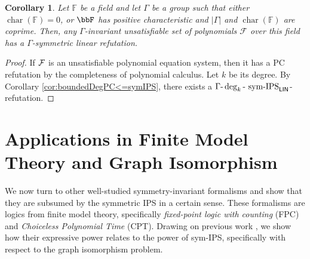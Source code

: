 \documentclass[10pt,a4paper]{article}
\newtheorem{corollary}[theorem]{Corollary}
\newcommand{\Ff}{{\cal F}}
\newcommand{\Field}{\ensuremath{\mathbb{F}}}
\newcommand{\F}{\ensuremath{\mathcal{F}}}
\newcommand{\symIPSlin}{\text{ \upshape sym-IPS}_{\mathsf{LIN}}}
\DeclareMathOperator{\charact}{char}
\begin{document}
\begin{corollary}
	\label{cor:completenessOfSymLinIPS}
	Let $\Field$ be a field and let $\Gamma$ be a group
	such that either $\charact(\Field) = 0$, or $\bbF$ has positive characteristic and $|\Gamma|$ and $\charact(\Field)$ are coprime.  Then, any $\Gamma$-invariant unsatisfiable set of polynomials $\F$ over this field has a $\Gamma$-symmetric linear refutation.
\end{corollary}	
\begin{proof}
	If $\Ff$ is an unsatisfiable polynomial equation system, then it has a PC refutation by the completeness of polynomial calculus. Let $k$ be its degree. By Corollary \ref{cor:boundedDegPC<=symIPS}, there exists a $\Gamma\text{-}\deg_k\text{-}\symIPSlin{}$-refutation.
\end{proof}










\section{Applications in Finite Model Theory and Graph Isomorphism}
\label{sec:appplications}
We now turn to other well-studied symmetry-invariant formalisms and show that they are subsumed by the symmetric IPS in a certain sense. These formalisms are logics from finite model theory, specifically \emph{fixed-point logic with counting} (FPC) and \emph{Choiceless Polynomial Time} (CPT). Drawing on previous work \cite{ggpp, Pago}, we show how their expressive power relates to the power of sym-IPS, specifically with respect to the graph isomorphism problem.
\end{document}
